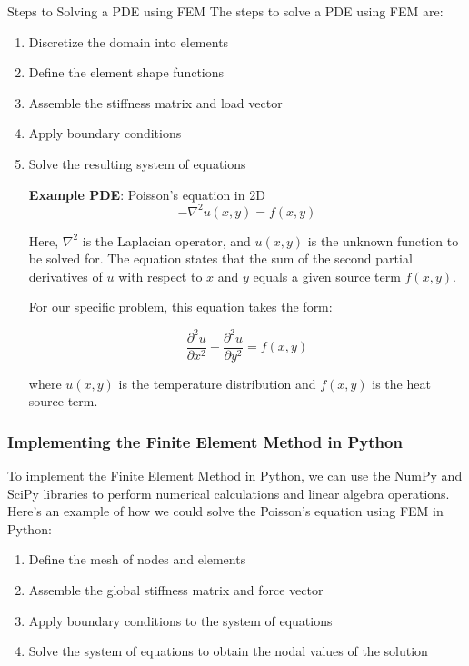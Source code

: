 \documentclass{beamer}
\begin{document}
\begin{frame}{Steps to Solving a PDE using FEM}
  The steps to solve a PDE using FEM are:
  \begin{enumerate}
      \item Discretize the domain into elements
      \item Define the element shape functions
      \item Assemble the stiffness matrix and load vector
      \item Apply boundary conditions
      \item Solve the resulting system of equations
      \vspace{0.5cm}
    
    \textbf{Example PDE}: Poisson's equation in 2D
    \begin{equation*}
        -\nabla^2 u(x,y) = f(x,y)
    \end{equation*}
    
    \vspace{0.3cm}
    
    Here, $\nabla^2$ is the Laplacian operator, and $u(x,y)$ is the unknown function to be solved for. The equation states that the sum of the second partial derivatives of $u$ with respect to $x$ and $y$ equals a given source term $f(x,y)$.
    
    For our specific problem, this equation takes the form:
    
    \begin{equation*}
        \frac{\partial^2 u}{\partial x^2} + \frac{\partial^2 u}{\partial y^2} = f(x,y)
    \end{equation*}
    
    where $u(x,y)$ is the temperature distribution and $f(x,y)$ is the heat source term.
\end{enumerate}
\end{frame}

\begin{frame}
    \frametitle{Implementing the Finite Element Method in Python}
    To implement the Finite Element Method in Python, we can use the NumPy and SciPy libraries to perform numerical calculations and linear algebra operations. Here's an example of how we could solve the Poisson's equation using FEM in Python:
    
    \begin{enumerate}
        \item Define the mesh of nodes and elements
        \item Assemble the global stiffness matrix and force vector
        \item Apply boundary conditions to the system of equations
        \item Solve the system of equations to obtain the nodal values of the solution
    \end{enumerate}  
\end{frame}
    
\end{document}
